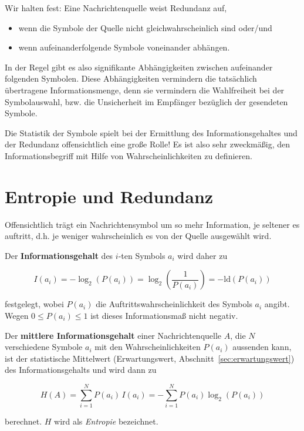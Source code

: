 

Wir halten fest: Eine Nachrichtenquelle weist Redundanz auf,

\begin{itemize}
  \item wenn die Symbole der Quelle nicht gleichwahrscheinlich sind oder/und
  \item wenn aufeinanderfolgende Symbole voneinander abhängen.
\end{itemize}

In der Regel gibt es also signifikante Abhängigkeiten zwischen aufeinander folgenden Symbolen. Diese Abhängigkeiten vermindern die tatsächlich übertragene Informationsmenge, denn sie vermindern die Wahlfreiheit bei der Symbolauswahl, bzw. die Unsicherheit im Empfänger bezüglich der gesendeten Symbole.

Die Statistik der Symbole spielt bei der Ermittlung des Informationsgehaltes und der Redundanz offensichtlich eine große Rolle! Es ist also sehr zweckmäßig, den Informationsbegriff mit Hilfe von Wahrscheinlichkeiten zu definieren.

\section{Entropie und Redundanz}
\label{sec:entropie-redundanz}

Offensichtlich trägt ein Nachrichtensymbol um so mehr Information, je seltener es auftritt, d.h. je weniger wahrscheinlich es von der Quelle ausgewählt wird.

\begin{definition}[Informationsgehalt]
Der \textbf{Informationsgehalt} des $i$-ten Symbols $a_i$ wird daher zu

$$
I(a_i) = -\log_2(P(a_i)) = \log_2\!\left(\frac{1}{P(a_i)}\right) = -\mathrm{ld}(P(a_i))
$$

festgelegt, wobei $P(a_i)$ die Auftrittswahrscheinlichkeit des Symbols $a_i$ angibt. Wegen $0 \leq P(a_i) \leq 1$ ist dieses Informationsmaß nicht negativ.
\end{definition}

\begin{definition}[Entropie]
Der \textbf{mittlere Informationsgehalt} einer Nachrichtenquelle $A$, die $N$ verschiedene Symbole $a_i$ mit den Wahrscheinlichkeiten $P(a_i)$ aussenden kann, ist der statistische Mittelwert (Erwartungswert, Abschnitt~\ref{sec:erwartungswert}) des Informationsgehalts und wird dann zu

$$
H(A) = \sum_{i=1}^{N} P(a_i)\, I(a_i) = -\sum_{i=1}^{N} P(a_i) \log_2(P(a_i))
$$

berechnet. $H$ wird als \textit{Entropie} bezeichnet.
\end{definition}

